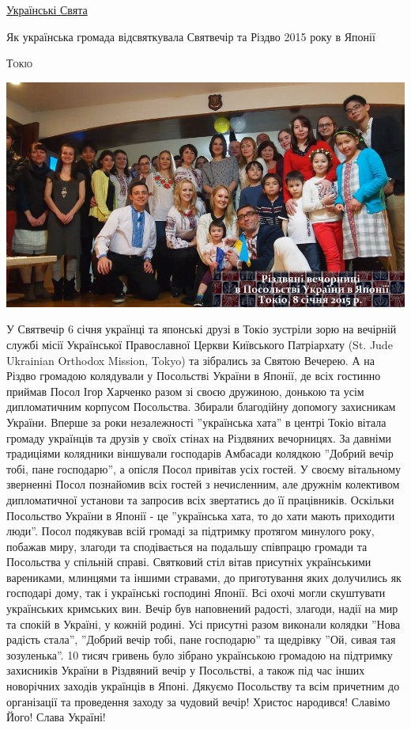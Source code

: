\documentclass[10pt,a4paper]{article}
\newcommand{\Category}[1]{%
		\begin{center}	
			\Large \usefont{T2A}{kurier}{m}{n}
			\underline{#1}%
		\end{center}	
		\par \normalsize \normalfont}
\newcommand{\NewsItem}[1]{%
		\usefont{T2A}{iwona}{m}{n} 
		\large #1 \vspace{4pt}
		\par \normalsize \normalfont}
\newcommand{\NewsAuthor}[1]{%
			\hfill \textsc{#1} \vspace{4pt}
			\par \normalfont}
\begin{document}
\newpage

\Category{Українські Свята}
\begin{multicols}{3}
\vspace{1cm}
\NewsItem{Як українська громада відсвяткувала Святвечір та Різдво 2015 року в Японії}
\NewsAuthor{Токіо}
		\begin{center}
			\includegraphics[width=0.8\linewidth]{images/rizdvo}
		\end{center}
У Святвечір 6 січня українці та японські друзі в Токіо зустріли зорю на вечірній службі місії Української Православної Церкви Київського Патріархату (St. Jude Ukrainian Orthodox Mission, Tokyo) та зібрались за Святою Вечерею.
А на Різдво громадою колядували у Посольствi України в Японії, де всіх гостинно приймав Посол Ігор Харченко разом зі своєю дружиною, донькою та усім дипломатичним корпусом Посольства. Збирали благодійну допомогу захисникам України.
Вперше за роки незалежності ''українська хата'' в центрі Токіо вітала громаду українців та друзів у своїх стінах на Різдвяних вечорницях. За давніми традиціями колядники віншували господарів Амбасади колядкою ''Добрий вечір тобі, пане господарю'', а опісля Посол привітав усіх гостей.
У своєму вітальному зверненні Посол познайомив всіх гостей з нечисленним, але дружнім колективом дипломатичної установи та запросив всіх звертатись до її працівників. Оскільки Посольство України в Японії - це ''українська хата, то до хати мають приходити люди''. Посол подякував всій громаді за підтримку протягом минулого року, побажав миру, злагоди та сподівається на подальшу співпрацю громади та Посольства у спільній справі.
Святковий стіл вітав присутніх українськими варениками, млинцями та іншими стравами, до приготування яких долучились як господарі дому, так і українські господині Японії. Всі охочі могли скуштувати українських кримських вин.
Вечір був наповнений радості, злагоди, надії на мир та спокій в Україні, у кожній родині. Усі присутні разом виконали колядки ''Нова радість стала'', ''Добрий вечір тобі, пане господарю'' та щедрівку ''Ой, сивая тая зозуленька''.
10 тисяч гривень було зібрано українською громадою на підтримку захисників України в Різдвяний вечір у Посольстві, а також під час інших новорічних заходів українців в Японі.
Дякуємо Посольству та всім причетним до організації та проведення заходу за чудовий вечір!
Христос народився! Славімо Його!
Слава Україні!


\end{multicols}
\end{document}
